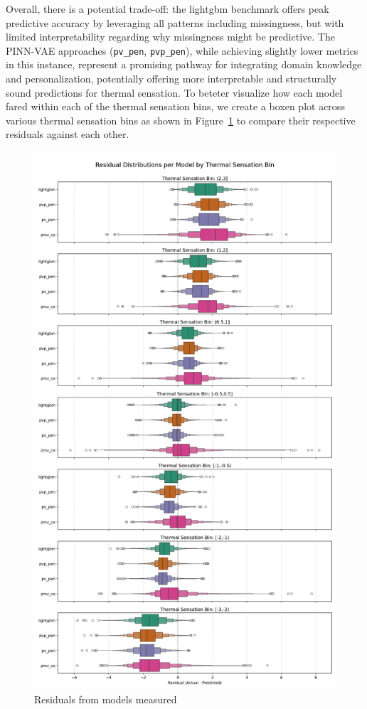 Overall, there is a potential trade-off: the lightgbm benchmark offers peak predictive accuracy by leveraging all patterns including missingness, but with limited interpretability regarding why missingness might be predictive. The PINN-VAE approaches (\texttt{pv\_pen}, \texttt{pvp\_pen}), while achieving slightly lower metrics in this instance, represent a promising pathway for integrating domain knowledge and personalization, potentially offering more interpretable and structurally sound predictions for thermal sensation.
To beteter visualize how each model fared within each of the thermal sensation bins, we create a boxen plot across various thermal sensation bins as shown in Figure~\ref{fig:residual-boxen} to compare their respective residuals against each other.
\begin{figure}[h!]
    \centering
    \includegraphics[width=0.55\linewidth]{fig/res_boxen.png}
    \caption{Residuals from models measured}
    \label{fig:residual-boxen}
\end{figure}

